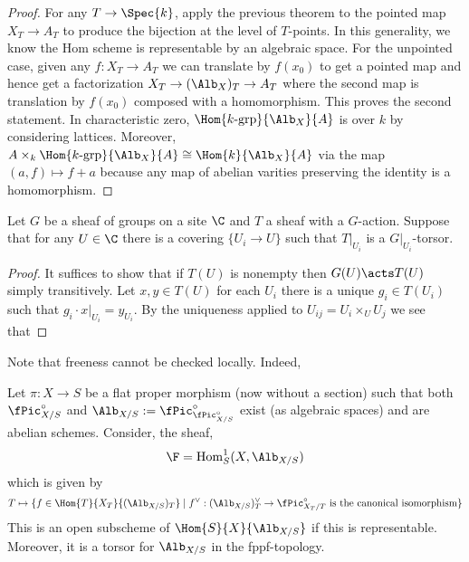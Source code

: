 \documentclass[12pt]{article}
\begin{document}
\begin{proof}
For any $T \to \Spec{k}$, apply the previous theorem to the pointed map $X_T \to A_T$ to produce the bijection at the level of $T$-points. In this generality, we know the Hom scheme is representable by an algebraic space. For the unpointed case, given any $f : X_T \to A_T$ we can translate by $f(x_0)$ to get a pointed map and hence get a factorization $X_T \to (\Alb_{X})_T \to A_T$ where the second map is translation by $f(x_0)$ composed with a homomorphism. This proves the second statement. In characteristic zero, $\Hom{k\text{-grp}}{\Alb_X}{A}$ is \etale over $k$ by considering lattices. Moreover, $A \times_k \Hom{k\text{-grp}}{\Alb_X}{A} \cong \Hom{k}{\Alb_X}{A}$ via the map $(a, f) \mapsto f + a$ because any map of abelian varities preserving the identity is a homomorphism.   
\end{proof}


\newcommand{\fHom}{\mathrm{Hom}}

\begin{lemma}
Let $G$ be a sheaf of groups on a site $\C$ and $T$ a sheaf with a $G$-action. Suppose that for any $U \in \C$ there is a covering $\{ U_i \to U \}$ such that $T|_{U_i}$ is a $G|_{U_i}$-torsor.
\end{lemma}

\begin{proof}
It suffices to show that if $T(U)$ is nonempty then $G(U) \acts T(U)$ simply transitively. Let $x,y \in T(U)$ for each $U_i$ there is a unique $g_i \in T(U_i)$ such that $g_i \cdot x|_{U_i} = y_{U_i}$. By the uniqueness applied to $U_{ij} = U_i \times_U U_j$ we see that 
\end{proof}

\begin{rmk}
Note that freeness cannot be checked locally. Indeed, 
\end{rmk}

\begin{prop}
Let $\pi : X \to S$ be a flat proper morphism (now without a section) such that both $\fPic_{X/S}^\circ$ and $\Alb_{X/S} := \fPic_{\fPic_{X/S}^\circ}^\circ$ exist (as algebraic spaces) and are abelian schemes. Consider, the sheaf,
\[ \F = \fHom_S^1(X, \Alb_{X/S}) \] 
which is given by 
\[ T \mapsto \{f \in \Hom{T}{X_T}{(\Alb_{X/S})_T} \mid f^\vee : (\Alb_{X/S})_T^\vee \to \fPic_{X_T/T}^\circ \text{ is the canonical isomorphism} \} \]
This is an open subscheme of $\Hom{S}{X}{\Alb_{X/S}}$ if this is representable. Moreover, it is a torsor for $\Alb_{X/S}$ in the fppf-topology.
\end{prop}
\end{document}
